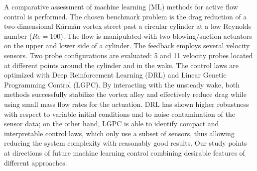 %
\graphicspath{{paper3/}}%
%
%
%
\begin{paper}

\makepapertitle

%
\begin{paperabstract}
A comparative assessment of machine learning (ML) methods for active flow control is performed. The chosen benchmark problem is the drag reduction of a two-dimensional Kármán vortex street past a circular cylinder at a low Reynolds number ($Re=100$). 
The flow is manipulated with two blowing/suction actuators on the upper and lower side of a cylinder. The feedback employs several velocity sensors. Two probe configurations are evaluated: 5 and 11 velocity probes located at different points around the cylinder and in the wake. 
The control laws are optimized with Deep Reinforcement Learning (DRL) and Linear Genetic Programming Control (LGPC). 
By interacting with the unsteady wake, both methods successfully stabilize the vortex alley and effectively reduce drag while using small mass flow rates for the actuation. DRL has shown higher robustness with respect to variable initial conditions and to noise contamination of the sensor data; on the other hand, LGPC is able to identify compact and interpretable control laws, which only use a subset of sensors, thus allowing reducing the system complexity with reasonably good results. 
Our study points at directions of future machine learning control combining desirable features of different approaches.

\end{paperabstract}


%



%


%


\end{paper}
